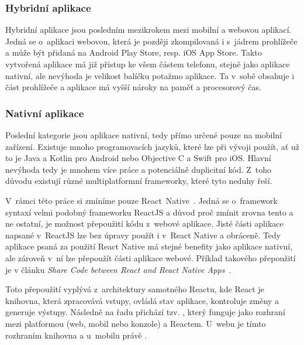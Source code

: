 \subsubsection*{Hybridní aplikace}
Hybridní aplikace jsou posledním mezikrokem mezi mobilní a webovou aplikací. Jedná se o~aplikaci webovou, která je později zkompilovaná i s~jádrem prohlížeče a může být přidaná na Android Play Store, resp. iOS App Store. Takto vytvořená aplikace má již přístup ke všem částem telefonu, stejně jako aplikace nativní, ale nevýhoda je velikost balíčku potažmo aplikace. Ta v~sobě obsahuje i část prohlížeče a aplikace má vyšší nároky na paměť a procesorový čas.

\subsubsection*{Nativní aplikace}
Poslední kategorie jsou aplikace nativní, tedy přímo určené pouze na mobilní zařízení. Existuje mnoho programovacích jazyků, které lze při vývoji použít, ať už to je Java a Kotlin pro Android nebo Objective C a Swift pro iOS. Hlavní nevýhoda tedy je mnohem více práce a potenciálně duplicitní kód. Z~toho důvodu existují různé multiplatformní frameworky, které tyto neduhy řeší.

V~rámci této práce si zmíníme pouze React~Native~\cite{facebookinc_2015_reactnative}. Jedná se o~framework syntaxí velmi podobný frameworku ReactJS a důvod proč zmínit zrovna tento a ne ostatní, je možnost přepoužití kódu z~webové aplikace. Jisté části aplikace napsané v~ReactJS lze bez úpravy použít i v~React Native a obráceně. Tedy aplikace psaná za použití React Native má stejné benefity jako aplikace nativní, ale zároveň v~ní lze přepoužít části aplikace webové. Příklad takového přepoužití je v článku \emph{Share Code between React and React Native Apps}~\cite{sepulveda_2017_share}.

Toto přepoužití vyplývá z~architektury samotného Reactu, kde React je knihovna, která zpracovává vstupy, ovládá stav aplikace, kontroluje změny a generuje výstupy. Následně na řadu přichází tzv. , který funguje jako rozhraní mezi platformou (web, mobil nebo konzole) a Reactem. U~webu je tímto rozhraním knihovna  a u~mobilu právě .

